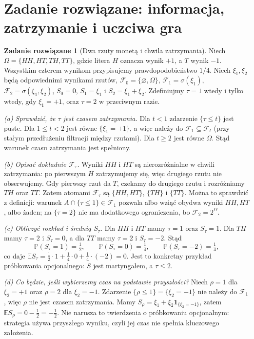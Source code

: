 \documentclass[11pt,a4paper,oneside]{report}
\numberwithin{equation}{chapter}
\theoremstyle{plain}
\theoremstyle{definition}
\newtheorem{zadanie}{Zadanie rozwiązane}[chapter]
\theoremstyle{remark}
\newcommand{\Prob}{\mathbb{P}}
\newcommand{\E}{\mathbb{E}}
\newcommand{\calF}{\mathcal{F}}
\newcommand{\ind}[1]{\mathbf{1}_{#1}}
\begin{document}
\section{Zadanie rozwiązane: informacja, zatrzymanie i uczciwa gra}
\begin{zadanie}[Dwa rzuty monetą i chwila zatrzymania]
Niech $\Omega=\{HH,HT,TH,TT\}$, gdzie litera $H$
oznacza wynik $+1$, a $T$ wynik $-1$.
Wszystkim czterem wynikom przypisujemy prawdopodobieństwo $1/4$.
Niech $\xi_1,\xi_2$ będą odpowiednimi wynikami
rzutów, $\calF_0=\{\varnothing,\Omega\}$,
$\calF_1=\sigma(\xi_1)$, $\calF_2=\sigma(\xi_1,\xi_2)$,
$S_0=0$, $S_1=\xi_1$ i $S_2=\xi_1+\xi_2$.
Zdefiniujmy $\tau=1$ wtedy i tylko wtedy, gdy
$\xi_1=+1$, oraz $\tau=2$ w przeciwnym razie.

\emph{(a) Sprawdzić, że $\tau$ jest czasem zatrzymania.}
Dla $t<1$ zdarzenie $\{\tau\le t\}$ jest puste.
Dla $1\le t<2$ jest równe $\{\xi_1=+1\}$,
a więc należy do $\calF_1\subseteq\calF_t$
(przy stałym przedłużeniu filtracji między rzutami).
Dla $t\ge2$ jest równe $\Omega$. Stąd warunek czasu
zatrzymania jest spełniony.

\emph{(b) Opisać dokładnie $\calF_\tau$.}
Wyniki $HH$ i $HT$ są nierozróżnialne w chwili
zatrzymania: po pierwszym $H$ zatrzymujemy się,
więc drugiego rzutu nie obserwujemy. Gdy pierwszy
rzut da $T$, czekamy do drugiego rzutu i rozróżniamy
$TH$ oraz $TT$. Zatem atomami $\calF_\tau$ są
$\{HH,HT\}$, $\{TH\}$ i $\{TT\}$.
Można to sprawdzić z definicji: warunek
$A\cap\{\tau\le1\}\in\calF_1$ pozwala
albo wziąć obydwa wyniki $HH,HT$, albo żaden;
na $\{\tau=2\}$ nie ma dodatkowego ograniczenia,
bo $\calF_2=2^\Omega$.

\emph{(c) Obliczyć rozkład i średnią $S_\tau$.}
Dla $HH$ i $HT$ mamy $\tau=1$ oraz $S_\tau=1$.
Dla $TH$ mamy $\tau=2$ i $S_\tau=0$,
a dla $TT$ mamy $\tau=2$ i $S_\tau=-2$. Stąd
\[
\Prob(S_\tau=1)=\tfrac12,\qquad
\Prob(S_\tau=0)=\tfrac14,\qquad
\Prob(S_\tau=-2)=\tfrac14,
\]
co daje $\E S_\tau=\tfrac12\cdot1+
\tfrac14\cdot0+\tfrac14\cdot(-2)=0$.
Jest to konkretny przykład próbkowania opcjonalnego:
$S$ jest martyngałem, a $\tau\le2$.

\emph{(d) Co będzie, jeśli wybierzemy czas na podstawie przyszłości?}
Niech $\rho=1$ dla $\xi_2=+1$ oraz $\rho=2$
dla $\xi_2=-1$. Zdarzenie $\{\rho\le1\}
=\{\xi_2=+1\}$ nie należy do $\calF_1$,
więc $\rho$ nie jest czasem zatrzymania.
Mamy $S_\rho=\xi_1+\xi_2\ind{\{\xi_2=-1\}}$,
zatem $\E S_\rho=0-\tfrac12=-\tfrac12$.
Nie narusza to twierdzenia o próbkowaniu opcjonalnym:
strategia używa przyszłego wyniku, czyli jej czas nie
spełnia kluczowego założenia.
\end{zadanie}
\end{document}
